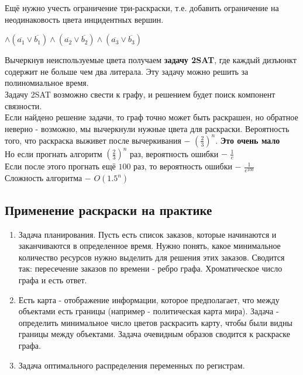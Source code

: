         Ещё нужно учесть ограничение три-раскраски, т.е. добавить ограничение на неодинаковость цвета инцидентных вершин.
        \begin{center}
            $\wedge (\overline{a_1} \vee \overline{b_1}) \wedge (\overline{a_2} \vee \overline{b_2}) \wedge (\overline{a_3} \vee \overline{b_3})$
        \end{center}
        Вычеркнув неиспользуемые цвета получаем \textbf{задачу 2SAT}, где каждый дизъюнкт содержит не больше чем два литерала. Эту задачу можно решить за полиномиальное время.\\
    
        Задачу 2SAT возможно свести к графу, и решением будет поиск компонент связности.\\
    
        Если найдено решение задачи, то граф точно может быть раскрашен, но обратное неверно - возможно, мы вычеркнули нужные цвета для раскраски. Вероятность того, что раскраска выживет после вычеркивания $-$ $(\frac{2}{3})^n$. \textbf{Это очень мало}\\
        Но если прогнать алгоритм $(\frac{2}{3})^n$ раз, вероятность ошибки $-$ $\frac{1}{e}$\\
        Если после этого прогнать ещё $100$ раз, то вероятность ошибки $-$ $\frac{1}{e^{100}}$\\
        
        Сложность алгоритма $-$ $O(1.5^n)$
        
        \subsection{Применение раскраски на практике}
    
            \begin{enumerate}
                \item Задача планирования. Пусть есть список заказов, которые начинаются и заканчиваются в определенное время. Нужно понять, какое минимальное количество ресурсов нужно выделить для решения этих заказов. Сводится так: пересечение заказов по времени - ребро графа. Хроматическое число графа и есть ответ.
                \item Есть карта - отображение информации, которое предполагает, что между объектами есть границы (например - политическая карта мира). Задача - определить минимальное число цветов раскрасить карту, чтобы были видны границы между объектами. Задача очевидным образов сводится к раскраске графа.
                \item Задача оптимального распределения переменных по регистрам.
            \end{enumerate}
    
